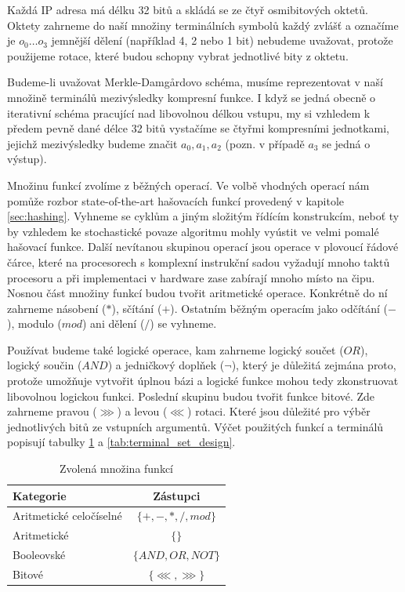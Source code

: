 Každá IP adresa má délku 32 bitů a skládá se ze čtyř osmibitových oktetů. Oktety zahrneme
do naší množiny terminálních symbolů každý zvlášť a označíme je $o_0 \ldots o_3$ jemnější 
dělení (například 4, 2 nebo 1 bit) nebudeme uvažovat, protože použijeme rotace,
které budou schopny vybrat jednotlivé bity z oktetu.

Budeme-li uvažovat Merkle-Damg\r{a}rdovo schéma, musíme reprezentovat v naší
množině terminálů mezivýsledky kompresní funkce. I když se jedná obecně o iterativní
schéma pracující nad libovolnou délkou vstupu, my si vzhledem k předem pevně 
dané délce 32 bitů vystačíme se čtyřmi kompresními jednotkami, jejichž mezivýsledky
budeme značit $a_0, a_1, a_2$ (pozn. v případě $a_3 $ se jedná o výstup). 

Množinu funkcí zvolíme z běžných operací. Ve volbě vhodných operací nám pomůže
rozbor state-of-the-art hašovacích funkcí provedený v kapitole \ref{sec:hashing}.
Vyhneme se cyklům a jiným složitým
řídícím konstrukcím, neboť ty by vzhledem ke stochastické povaze algoritmu mohly
vyústit ve velmi pomalé hašovací funkce. Další nevítanou skupinou operací jsou operace
v plovoucí řádové čárce, které na procesorech s komplexní instrukční sadou vyžadují
mnoho taktů procesoru a při implementaci v hardware zase zabírají mnoho místo na čipu.
Nosnou část množiny funkcí budou tvořit aritmetické operace. Konkrétně do ní zahrneme
násobení ($*$), sčítání ($+$). Ostatním běžným operacím jako  odčítání ($-$), modulo ($mod$) ani dělení ($/$)
se vyhneme.

Používat budeme také logické operace,
kam zahrneme logický součet ($OR$), logický součin ($AND$) a jedničkový doplňek ($\neg$), který 
je důležitá zejmána proto, protože umožňuje vytvořit úplnou bázi a logické funkce mohou
tedy zkonstruovat libovolnou logickou funkci. Poslední skupinu budou tvořit funkce bitové.
Zde zahrneme pravou ($\ggg$) a levou ($\lll$) rotaci. Které jsou důležité pro výběr 
jednotlivých bitů ze vstupních argumentů. Výčet použitých funkcí a terminálů
popisují tabulky \ref{tab:function_set_design} a \ref{tab:terminal_set_design}.

\begin{table}
\begin{center}
\begin{tabular}{ |l|c| }
	\hline
   	Kategorie & Zástupci \\
  	\hline
  	Aritmetické celočíselné  & $\{ +,-,*,/,mo	d \}$ \\
  	Aritmetické                     & $\{\}$ \\
  	Booleovské				      & $\{AND, OR, NOT\}$ \\
  	Bitové					          & $\{ \lll, \ggg \}$ \\ 	 
  	\hline
\end{tabular}
\caption{Zvolená množina funkcí}
\label{tab:function_set_design}
\end{center}
\end{table}

